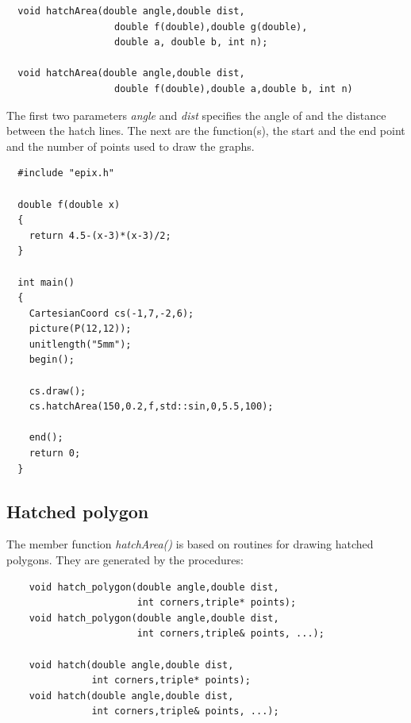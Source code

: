 \documentclass[12pt,a4paper]{article}
\begin{document}
  \begin{lstlisting}
  void hatchArea(double angle,double dist,
                   double f(double),double g(double),
                   double a, double b, int n);

  void hatchArea(double angle,double dist,
                   double f(double),double a,double b, int n)
  \end{lstlisting}

  The first two parameters \textit{angle} and \textit{dist} specifies
  the angle of and the distance between the hatch lines. The next are
  the function(s), the start and the end point and the number of
  points used to draw the graphs.

  \begin{minipage}{7.5cm}
    \begin{lstlisting}
  #include "epix.h"

  double f(double x)
  {
    return 4.5-(x-3)*(x-3)/2;
  }

  int main()
  {
    CartesianCoord cs(-1,7,-2,6);
    picture(P(12,12));
    unitlength("5mm");
    begin();

    cs.draw();
    cs.hatchArea(150,0.2,f,std::sin,0,5.5,100);

    end();
    return 0;
  }
    \end{lstlisting}
  \end{minipage}
  \begin{minipage}{5.5cm}
    
    \vspace{1.8cm}
  \end{minipage}


  \subsection{Hatched polygon}

  The member function \textit{hatchArea()} is based on routines for drawing
  hatched polygons. They are generated by the procedures:

  \begin{lstlisting}
    void hatch_polygon(double angle,double dist,
                       int corners,triple* points);
    void hatch_polygon(double angle,double dist,
                       int corners,triple& points, ...);

    void hatch(double angle,double dist,
               int corners,triple* points);
    void hatch(double angle,double dist,
               int corners,triple& points, ...);
  \end{lstlisting}
\end{document}
